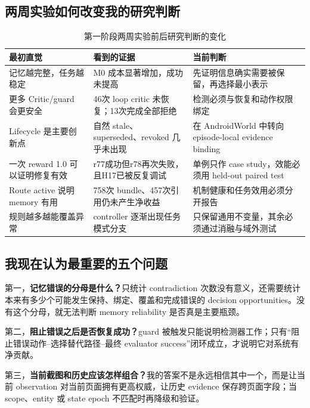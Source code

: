 \documentclass[12pt,a4paper]{ctexart}
\begin{document}
\subsection{两周实验如何改变我的研究判断}

\begin{table}[H]
    \centering
    \caption{第一阶段两周实验前后研究判断的变化}
    \label{tab:thinking-shift}
    \small
    \begin{tabularx}{\textwidth}{p{3.7cm}p{4.9cm}Y}
        \toprule
        最初直觉 & 看到的证据 & 当前判断 \\
        \midrule
        记忆越完整，任务越稳定 & M0 成本显著增加，成功未提高 & 先证明信息确实需要被保留，再选择最小表示 \\
        更多 Critic/guard 会更安全 & 46次 loop critic 未恢复；13次完成全部拒绝 & 检测必须与恢复和动作权限绑定 \\
        Lifecycle 是主要创新点 & 自然 stale、superseded、revoked 几乎未出现 & 在 AndroidWorld 中转向 episode-local evidence binding \\
        一次 reward 1.0 可以证明修复有效 & r77成功但r78再次失败，且H17已被反复调试 & 单例只作 case study，效能必须用 held-out paired test \\
        Route active 说明 memory 有用 & 758次 bundle、457次引用仍未产生净收益 & 机制健康和任务效用必须分开报告 \\
        规则越多越能覆盖异常 & controller 逐渐出现任务模式分支 & 只保留通用不变量，其余必须通过消融与域外测试 \\
        \bottomrule
    \end{tabularx}
\end{table}

\subsection{我现在认为最重要的五个问题}

第一，\textbf{记忆错误的分母是什么？}只统计 contradiction 次数没有意义，还需要统计本来有多少个可能发生保持、绑定、覆盖和完成错误的 decision opportunities。没有这个分母，就无法判断 memory reliability 是否真是主要瓶颈。

第二，\textbf{阻止错误之后是否恢复成功？}guard 被触发只能说明检测器工作；只有“阻止错误动作--选择替代路径--最终 evaluator success”闭环成立，才说明它对系统有净贡献。

第三，\textbf{当前截图和历史应该怎样组合？}我的答案不是永远相信其中一个，而是让当前 observation 对当前页面拥有更高权威，让历史 evidence 保存跨页面字段；当 scope、entity 或 state epoch 不匹配时再降级和验证。
\end{document}
